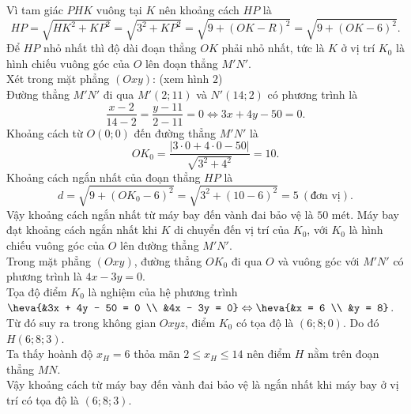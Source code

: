 \begin{ex}
{\begin{itemchoice}
\begin{center}
			\end{center}
			Vì tam giác $PHK$ vuông tại $K$ nên khoảng cách $HP$ là \[HP = \sqrt{HK^2 + KP^2} = \sqrt{3^2 + KP^2}=\sqrt{9 + (OK-R)^2}=\sqrt{9 + (OK-6)^2}.\]
			Để $HP$ nhỏ nhất thì độ dài đoạn thẳng $OK$ phải nhỏ nhất, tức là $K$ ở vị trí $K_0$ là hình chiếu vuông góc của $O$ lên đoạn thẳng $M'N'$.\\
			Xét trong mặt phẳng $(Oxy)$: (xem hình $2$)\\
			Đường thẳng $M'N'$ đi qua $M'(2; 11)$ và $N'(14; 2)$ có phương trình là
			\[\dfrac{x - 2}{14-2}= \dfrac{y - 11}{2-11} = 0 \Leftrightarrow 3x + 4y - 50 = 0.\]
			Khoảng cách từ $O(0; 0)$ đến đường thẳng $M'N'$ là \[OK_0= \dfrac{|3 \cdot 0 + 4 \cdot 0 - 50|}{\sqrt{3^2 + 4^2}} = 10.\]
			Khoảng cách ngắn nhất của đoạn thẳng $HP$ là 
			\[d = \sqrt{9 + (OK_0-6)^2}= \sqrt{3^2 + (10 - 6)^2} = 5\ (\text{đơn vị}).
			\]
			Vậy khoảng cách ngắn nhất từ máy bay đến vành đai bảo vệ là $50$ mét.		
			\itemch Máy bay đạt khoảng cách ngắn nhất khi $K$ di chuyển đến vị trí của $K_0$, với $K_0$ là hình chiếu vuông góc của $O$ lên đường thẳng $M'N'$.\\
			Trong mặt phẳng $(Oxy)$, đường thẳng $OK_0$ đi qua $O$ và vuông góc với $M'N'$ có phương trình là $4x - 3y = 0$.\\
			Tọa độ điểm $K_0$ là nghiệm của hệ phương trình $\heva{&3x + 4y - 50 = 0 \\ &4x - 3y = 0} \Leftrightarrow \heva{&x = 6 \\ &y = 8}$.\\
			Từ đó suy ra trong không gian $Oxyz$, điểm $K_0$ có tọa độ là $(6; 8; 0)$. Do đó $H(6; 8; 3)$.\\
			Ta thấy hoành độ $x_H = 6$ thỏa mãn $2 \le x_H \le 14$ nên điểm $H$ nằm trên đoạn thẳng $MN$.\\
			Vậy khoảng cách từ máy bay đến vành đai bảo vệ là ngắn nhất khi máy bay ở vị trí có tọa độ là $(6; 8; 3)$.
		\end{itemchoice}
	}
\end{ex}

